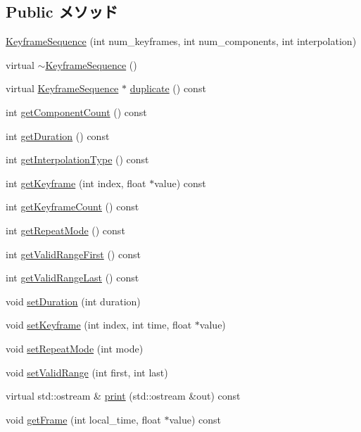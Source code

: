 \subsection*{Public メソッド}
\begin{CompactItemize}
\item 
\hyperlink{classm3g_1_1KeyframeSequence_f48cc8113ad7300d72840b18529aaf0e}{KeyframeSequence} (int num\_\-keyframes, int num\_\-components, int interpolation)
\item 
virtual \hyperlink{classm3g_1_1KeyframeSequence_464f5929e3302c788ca626c11ca8d656}{$\sim$KeyframeSequence} ()
\item 
virtual \hyperlink{classm3g_1_1KeyframeSequence}{KeyframeSequence} $\ast$ \hyperlink{classm3g_1_1KeyframeSequence_f925b7c3107b6cdba08dbb045b203b4f}{duplicate} () const 
\item 
int \hyperlink{classm3g_1_1KeyframeSequence_7016f51d2788e78fdd736efd040f5e5e}{getComponentCount} () const 
\item 
int \hyperlink{classm3g_1_1KeyframeSequence_995a5ca5c8c3c993ef167f67cbb5fabe}{getDuration} () const 
\item 
int \hyperlink{classm3g_1_1KeyframeSequence_0d46321e7f46e037508cce88cdf6a487}{getInterpolationType} () const 
\item 
int \hyperlink{classm3g_1_1KeyframeSequence_0fd27047149eedab8b10319768e1fe9a}{getKeyframe} (int index, float $\ast$value) const 
\item 
int \hyperlink{classm3g_1_1KeyframeSequence_4d500a603f25adafd8e6f8b68872dbff}{getKeyframeCount} () const 
\item 
int \hyperlink{classm3g_1_1KeyframeSequence_a356af60b9759d5d3da833773e3c7b73}{getRepeatMode} () const 
\item 
int \hyperlink{classm3g_1_1KeyframeSequence_b7e54386674cefdb8f5fa65ce5435b50}{getValidRangeFirst} () const 
\item 
int \hyperlink{classm3g_1_1KeyframeSequence_aa98cc8d698c482c33a3487c33db27d0}{getValidRangeLast} () const 
\item 
void \hyperlink{classm3g_1_1KeyframeSequence_d7406d5e0e2f398e05e3563d099dfdf1}{setDuration} (int duration)
\item 
void \hyperlink{classm3g_1_1KeyframeSequence_700d02a4ac28514016721e4b1d2bcf96}{setKeyframe} (int index, int time, float $\ast$value)
\item 
void \hyperlink{classm3g_1_1KeyframeSequence_e5cd1486fe0a8a61cf96816e976d7f87}{setRepeatMode} (int mode)
\item 
void \hyperlink{classm3g_1_1KeyframeSequence_b5a824131cef547816366141afe0339a}{setValidRange} (int first, int last)
\item 
virtual std::ostream \& \hyperlink{classm3g_1_1KeyframeSequence_6fea17fa1532df3794f8cb39cb4f911f}{print} (std::ostream \&out) const 
\item 
void \hyperlink{classm3g_1_1KeyframeSequence_e172563df4ce29c6fa9bca679e9bba7c}{getFrame} (int local\_\-time, float $\ast$value) const 
\end{CompactItemize}
